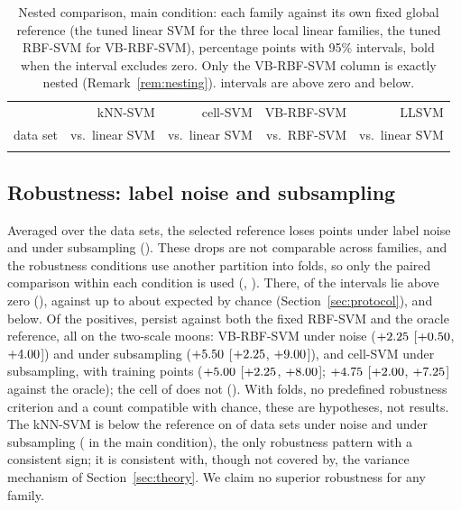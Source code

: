 \documentclass[11pt,a4paper]{article}
\theoremstyle{plain}
\theoremstyle{definition}
\theoremstyle{remark}
\begin{document}
\begin{table}[t]
\centering\footnotesize
\setlength{\tabcolsep}{4pt}
\begin{tabular}{lrrrr}
\toprule
& kNN-SVM & cell-SVM & VB-RBF-SVM & LLSVM\\
data set & vs.\ linear SVM & vs.\ linear SVM & vs.\ RBF-SVM & vs.\ linear SVM\\
\midrule
\\
\bottomrule
\end{tabular}
\caption{Nested comparison, main condition: each family against its own fixed global reference (the tuned linear SVM for the three local linear families, the tuned RBF-SVM for VB-RBF-SVM), percentage points with 95\% intervals, bold when the interval excludes zero. Only the VB-RBF-SVM column is exactly nested (Remark~\ref{rem:nesting}). \NestNPosMain{} intervals are above zero and \NestNNegMain{} below.}
\label{tab:nested}
\end{table}

\subsection{Robustness: label noise and subsampling}

Averaged over the data sets, the selected reference loses \DropNoiseBest{} points under label noise and \DropSubBest{} under subsampling (). These drops are not comparable across families, and the robustness conditions use another partition into folds, so only the paired comparison within each condition is used (, ). There, \NPosRobustCells{} of the \NRobustCells{} intervals lie above zero (\PosCellsRobust), against up to about \ExpectedPosRobust{} expected by chance (Section~\ref{sec:protocol}), and \NNegRobustCells{} below. Of the positives, \NPosRobustPersist{} persist against both the fixed RBF-SVM and the oracle reference, all on the two-scale moons: VB-RBF-SVM under noise ($+2.25$ [$+0.50$, $+4.00$]) and under subsampling ($+5.50$ [$+2.25$, $+9.00$]), and cell-SVM under subsampling, with \NTrainSubMoons{} training points ($+5.00$ [$+2.25$, $+8.00$]; $+4.75$ [$+2.00$, $+7.25$] against the oracle); the cell of \PosRobustNotPersist{} does not (). With \NRobFolds{} folds, no predefined robustness criterion and a count compatible with chance, these are hypotheses, not results. The kNN-SVM is below the reference on \NNegNoiseKnn{} of \NDatasets{} data sets under noise and \NNegSubKnn{} under subsampling (\NNegMainKnn{} in the main condition), the only robustness pattern with a consistent sign; it is consistent with, though not covered by, the variance mechanism of Section~\ref{sec:theory}. We claim no superior robustness for any family.
\end{document}
